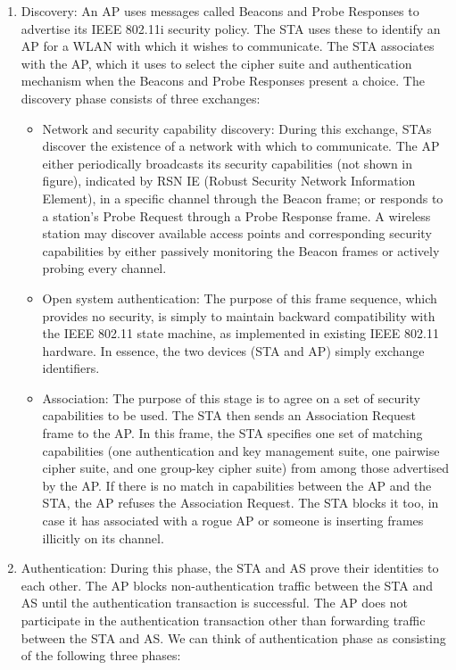 \documentclass[12pt]{article}
\begin{document}
 \begin{enumerate}
 	\item Discovery: An AP uses messages called Beacons and Probe Responses to advertise its IEEE 802.11i security policy. The STA uses these to identify an AP for a WLAN with which it wishes to communicate. The STA associates with the AP, which it uses to select the cipher suite and authentication mechanism when the Beacons and
 	Probe Responses present a choice. The discovery phase consists of three exchanges:
 	\begin{itemize}
 		\item Network and security capability discovery: During this exchange, STAs discover the existence of a network with which to communicate. The AP either periodically broadcasts its security capabilities (not shown in figure), indicated by RSN IE (Robust Security Network Information Element), in a specific channel through the Beacon frame; or responds to a station’s Probe Request through a Probe Response frame. A 	wireless station may discover available access points and corresponding security capabilities by either passively monitoring the Beacon frames or actively probing every channel.
 		\item Open system authentication: The purpose of this frame sequence, which provides no security, is simply to maintain backward compatibility with the IEEE 802.11 state machine, as implemented in existing IEEE 802.11 hardware. In essence, the two devices (STA and AP) simply exchange identifiers.
 		\item Association: The purpose of this stage is to agree on a set of security capabilities to be used. The STA then sends an Association Request frame to the AP. In this frame, the STA specifies one set of matching capabilities (one authentication and key management suite, one pairwise cipher suite, and one group-key cipher suite) from among those advertised by the AP. If there is no match in capabilities between the AP and the STA, the AP refuses the Association Request. The STA blocks it too, in case it has associated with a rogue AP or someone is inserting frames illicitly on its channel.
 	\end{itemize}
 	\item Authentication: During this phase, the STA and AS prove their identities to each other. The AP blocks non-authentication traffic between the STA and AS until the authentication transaction is successful. The AP does not participate in the authentication transaction other than forwarding traffic between the STA and AS. We can think of authentication phase as consisting of the following three phases:

\end{enumerate}
\end{document}
